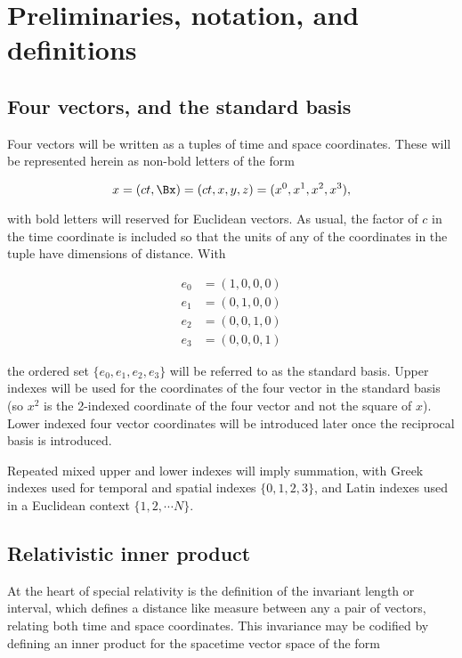 \section{Preliminaries, notation, and definitions}

\subsection{Four vectors, and the standard basis}

Four vectors will be written as a tuples of time and space coordinates.  These will be represented herein as non-bold letters of the form

\begin{equation}\label{eqn:grahamSchmidtLorentz:10}
x = (c t, \Bx) = ( c t, x, y, z ) = ( x^0, x^1, x^2, x^3 ),
\end{equation}

with bold letters will reserved for Euclidean vectors.  As usual, the factor of $c$ in the time coordinate is included so that the units of any of the coordinates in the tuple have dimensions of distance.  With

\begin{equation}\label{eqn:grahamSchmidtLorentz:70}
\begin{aligned}
e_0 &= (1, 0, 0, 0) \\
e_1 &= (0, 1, 0, 0) \\
e_2 &= (0, 0, 1, 0) \\
e_3 &= (0, 0, 0, 1)
\end{aligned}
\end{equation}

the ordered set $\{e_0, e_1, e_2, e_3\}$ will be referred to as the standard basis.  Upper indexes will be used for the coordinates of the four vector in the standard basis (so $x^2$ is the 2-indexed coordinate of the four vector and not the square of $x$).  Lower indexed four vector coordinates will be introduced later once the reciprocal basis is introduced.

Repeated mixed upper and lower indexes will imply summation, with Greek indexes used for temporal and spatial indexes $\{0, 1, 2, 3\}$, and Latin indexes used in a Euclidean context $\{1, 2, \cdots N\}$.

\subsection{Relativistic inner product}

At the heart of special relativity is the definition of the invariant length or interval, which defines a distance like measure between any a pair of vectors, relating both time and space coordinates.  This invariance may be codified by defining an inner product for the spacetime vector space of the form

